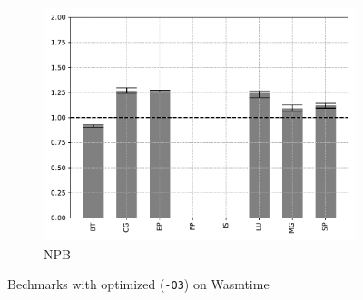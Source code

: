 \begin{figure}
\begin{subfigure}[t]{.45\textwidth}
        \includegraphics[width=\textwidth]
        {Images/6.1.RQ1/npb-wasmtime-opt.pdf}
        \caption{NPB}
    \end{subfigure}
    \caption{Bechmarks with optimized (\texttt{-O3}) on Wasmtime}
\end{figure}

